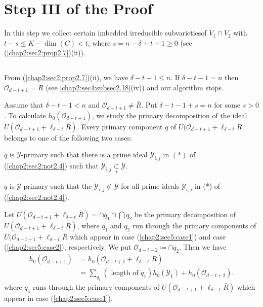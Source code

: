 \section{Step III of the Proof}\label{chap2:sec5}%

\begin{step} \label{chap2:sec5:step3}
  In this step we collect certain imbedded irreducible
  subvarieties\pageoriginale of 
  $V_1 \cap V_2$ with $t-s \leq K - \dim (C) < t$, where $s=
  n-\delta+t+1\geq 0$ (see (\ref{chap2:sec2:prop2.7})(ii)). 
\end{step}

\setcounter{subsection}{20}
\subsection{} \label{chap2:sec5:subsec2.21}
From (\ref{chap2:sec2:prop2.7})(ii), we have $\delta-t-1\leq n$. If
$\delta-t-1 = n$ then 
$\mathscr{O}_{d-t+1} = \bar{R}$ (see \ref{chap2:sec4:subsec2.18}(iv))
and our algorithm stops. 

Assume that $\delta -t-1<n$ and $\mathscr{O}_{d-t+1} \neq
\bar{R}$. Put $\delta -t-1+s = n$ for some $s>0$. To calculate
$h_0(\mathscr{O}_{d-t+1})$, we study the primary decomposition of the
ideal $U(\mathscr{O}_{d-t+1}+\ell_{\delta-t}\bar{R})$. Every primary
component $q$ of $U(\mathscr{O}_{d-t+1}+\ell_{\delta-t}\bar{R}$
belongs to one of the following two cases: 

\setcounter{case}{0}
\begin{case}\label{chap2:sec5:case1}%
  $q$ is $\mathscr{Y}$-primary such that there is a prime ideal
  $\mathscr{Y}_{i,j}$ in $(*)$ of (\ref{chap2:sec2:not2.4}) such that
  $\mathscr{Y}_{i,j}\underset{+}{\subset} \mathscr{Y}$. 
\end{case}

\begin{case}\label{chap2:sec5:case2}%
$q$ is $\mathscr{Y}$-primary such that the
  $\mathscr{Y}_{i,j}\not\subset\mathscr{Y}$ for all prime ideals
  $\mathscr{Y}_{i,j}$ in (*) of (\ref{chap2:sec2:not2.4}). 
\end{case}

Let $U(\mathscr{O}_{d-t+1}+\ell_{\delta-t}\bar{R})= \cap q_1 \cap
\bigcap q_2$  be the primary decomposition of
$U(\mathscr{O}_{d-t+1}+\ell_{\delta-t}\bar{R})$, where $q_1$ and $q_2$
run through the primary components of
$U(\mathscr{O}_{d-t+1}+\ell_{\delta-t}\bar{R}$ which appear in case
(\ref{chap2:sec5:case1}) and case (\ref{chap2:sec5:case2}),
respectively. We put $\mathscr{O}_{d-t+2} \coloneqq \cap q_2$. Then we have 
\begin{align*}
  h_0(\mathscr{O}_{d-t+1}) & = h_0(\mathscr{O}_{d-t+1}+\ell_{\delta-t}\bar{R})\\
  & = \sum_{q_1} (\text{ length of } q_1) h_0(\mathscr{Y}_{1}) +
  h_0(\mathscr{O}_{d-t+2}). 
\end{align*}
where $q_1$ runs through the primary components of
$U(\mathscr{O}_{d-t+1}+\ell_{\delta-t}\bar{R})$ which appear in case
(\ref{chap2:sec5:case1}). 

